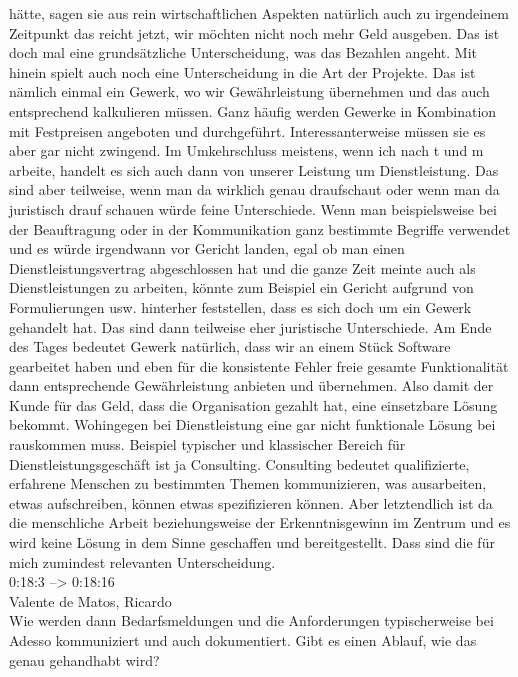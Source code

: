 hätte, sagen sie aus rein wirtschaftlichen Aspekten natürlich auch zu irgendeinem Zeitpunkt das reicht jetzt, wir möchten nicht noch mehr Geld ausgeben. Das ist doch mal eine grundsätzliche Unterscheidung, was das Bezahlen angeht. Mit hinein spielt auch noch eine Unterscheidung in die Art der Projekte. Das ist nämlich einmal ein Gewerk, wo wir Gewährleistung übernehmen und das auch entsprechend kalkulieren müssen. Ganz häufig werden Gewerke in Kombination mit Festpreisen angeboten und durchgeführt. Interessanterweise müssen sie es aber gar nicht zwingend. Im Umkehrschluss meistens, wenn ich nach t und m arbeite, handelt es sich auch dann von unserer Leistung um Dienstleistung. Das sind aber teilweise, wenn man da wirklich genau draufschaut oder wenn man da juristisch drauf schauen würde feine Unterschiede. Wenn man beispielsweise bei der Beauftragung oder in der Kommunikation ganz bestimmte Begriffe verwendet und es würde irgendwann vor Gericht landen, egal ob man einen Dienstleistungsvertrag abgeschlossen hat und die ganze Zeit meinte auch als Dienstleistungen zu arbeiten, könnte zum Beispiel ein Gericht aufgrund von Formulierungen usw. hinterher feststellen, dass es sich doch um ein Gewerk gehandelt hat. Das sind dann teilweise eher juristische Unterschiede. Am Ende des Tages bedeutet Gewerk natürlich, dass wir an einem Stück Software gearbeitet haben und eben für die konsistente Fehler freie gesamte Funktionalität dann entsprechende Gewährleistung anbieten und übernehmen. Also damit der Kunde für das Geld, dass die Organisation gezahlt hat, eine einsetzbare Lösung bekommt. Wohingegen bei Dienstleistung eine gar nicht funktionale Lösung bei rauskommen muss. Beispiel typischer und klassischer Bereich für Dienstleistungsgeschäft ist ja Consulting. Consulting bedeutet qualifizierte, erfahrene Menschen zu bestimmten Themen kommunizieren, was ausarbeiten, etwas aufschreiben, können etwas spezifizieren können. Aber letztendlich ist da die menschliche Arbeit beziehungsweise der Erkenntnisgewinn im Zentrum und es wird keine Lösung in dem Sinne geschaffen und bereitgestellt. Dass sind die für mich zumindest relevanten Unterscheidung. \\

0:18:3 --> 0:18:16\\
Valente de Matos, Ricardo\\
Wie werden dann Bedarfsmeldungen und die Anforderungen typischerweise bei Adesso kommuniziert und auch dokumentiert. Gibt es einen Ablauf, wie das genau gehandhabt wird?\\

